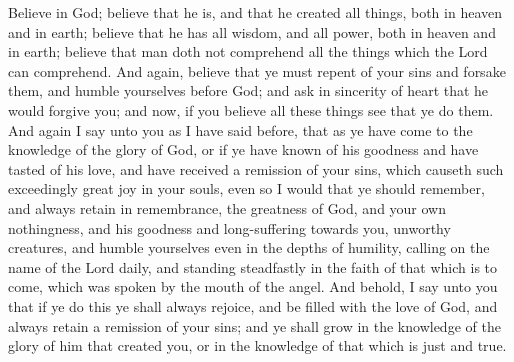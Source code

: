 Believe in God; believe that he is, and that he created all things, both in heaven and in earth; believe that he has all wisdom, and all power, both in heaven and in earth; believe that man doth not comprehend all the things which the Lord can comprehend.
\bverse \iffalse And again, believe that ye must repent of your sins and forsake them, and humble yourselves before God; and ask in sincerity of heart that he would forgive you; and now, if you believe all these things see that ye do them. \fi
And again, believe that ye must repent of your sins and forsake them, and humble yourselves before God; and ask in sincerity of heart that he would forgive you; and now, if you believe all these things see that ye do them.
\bverse \iffalse And again I say unto you as I have said before, that as ye have come to the knowledge of the glory of God, or if ye have known of his goodness and have tasted of his love, and have received a remission of your sins, which causeth such exceedingly great joy in your souls, even so I would that ye should remember, and always retain in remembrance, the greatness of God, and your own nothingness, and his goodness and long-suffering towards you, unworthy creatures, and humble yourselves even in the depths of humility, calling on the name of the Lord daily, and standing steadfastly in the faith of that which is to come, which was spoken by the mouth of the angel. \fi
And again I say unto you as I have said before, that as ye have come to the knowledge of the glory of God, or if ye have known of his goodness and have tasted of his love, and have received a remission of your sins, which causeth such exceedingly great joy in your souls, even so I would that ye should remember, and always retain in remembrance, the greatness of God, and your own nothingness, and his goodness and long-suffering towards you, unworthy creatures, and humble yourselves even in the depths of humility, calling on the name of the Lord daily, and standing steadfastly in the faith of that which is to come, which was spoken by the mouth of the angel.
\bverse \iffalse And behold, I say unto you that if ye do this ye shall always rejoice, and be filled with the love of God, and always retain a remission of your sins; and ye shall grow in the knowledge of the glory of him that created you, or in the knowledge of that which is just and true. \fi
And behold, I say unto you that if ye do this ye shall always rejoice, and be filled with the love of God, and always retain a remission of your sins; and ye shall grow in the knowledge of the glory of him that created you, or in the knowledge of that which is just and true.
